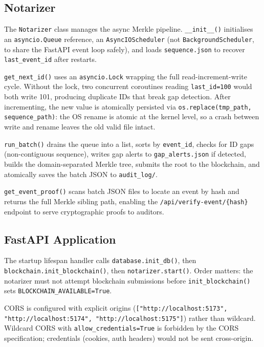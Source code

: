 \documentclass[12pt,a4paper]{article}
\begin{document}
\subsection{Notarizer}
\label{sec:notarizer}

The \texttt{Notarizer} class manages the async Merkle pipeline.
\texttt{\_\_init\_\_()} initialises an \texttt{asyncio.Queue} reference,
an \texttt{AsyncIOScheduler} (not \texttt{BackgroundScheduler}, to share
the FastAPI event loop safely), and loads \texttt{sequence.json} to
recover \texttt{last\_event\_id} after restarts.

\texttt{get\_next\_id()} uses an \texttt{asyncio.Lock} wrapping the full
read-increment-write cycle. Without the lock, two concurrent coroutines
reading \texttt{last\_id=100} would both write 101, producing duplicate
IDs that break gap detection. After incrementing, the new value is
atomically persisted via \texttt{os.replace(tmp\_path, sequence\_path)}:
the OS rename is atomic at the kernel level, so a crash between write
and rename leaves the old valid file intact.

\texttt{run\_batch()} drains the queue into a list, sorts by
\texttt{event\_id}, checks for ID gaps (non-contiguous sequence),
writes gap alerts to \texttt{gap\_alerts.json} if detected, builds the
domain-separated Merkle tree, submits the root to the blockchain, and
atomically saves the batch JSON to \texttt{audit\_log/}.

\texttt{get\_event\_proof()} scans batch JSON files to locate an event
by hash and returns the full Merkle sibling path, enabling the
\texttt{/api/verify-event/\{hash\}} endpoint to serve cryptographic
proofs to auditors.

\subsection{FastAPI Application}
\label{sec:fastapi}

The startup lifespan handler calls \texttt{database.init\_db()},
then \texttt{blockchain.init\_blockchain()}, then
\texttt{notarizer.start()}. Order matters: the notarizer must not
attempt blockchain submissions before \texttt{init\_blockchain()} sets
\texttt{BLOCKCHAIN\_AVAILABLE=True}.

CORS is configured with explicit origins
(\texttt{["http://localhost:5173", "http://localhost:5174",
"http://localhost:5175"]}) rather than wildcard. Wildcard CORS with
\texttt{allow\_credentials=True} is forbidden by the CORS specification;
credentials (cookies, auth headers) would not be sent cross-origin.
\end{document}
